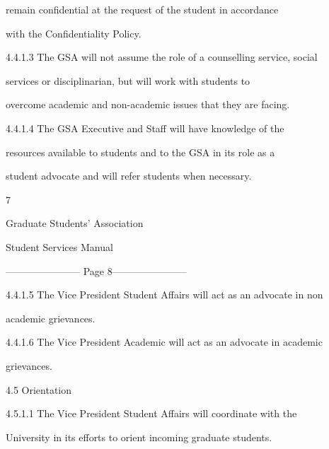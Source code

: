               remain  confidential  at  the  request  of  the  student  in  accordance  

              with the Confidentiality Policy.   



4.4.1.3       The GSA will not assume the role of a counselling service, social  

              services     or   disciplinarian,   but       will    work     with    students     to  

              overcome academic and non-academic issues that they are facing.   



4.4.1.4       The   GSA   Executive   and   Staff   will   have   knowledge   of  the  

              resources  available  to  students  and  to  the  GSA  in  its  role  as  a  

              student advocate and will refer students when necessary.   



                                                 7  



                                   Graduate Students’ Association  



                                        Student Services Manual  



  


----------------------- Page 8-----------------------

   4.4.1.5     The Vice President Student Affairs will act as an advocate in non  

               academic grievances.   



   4.4.1.6     The Vice President Academic will act as an advocate in academic  

               grievances.   



  



                                        4.5      Orientation   



   4.5.1.1     The  Vice  President  Student  Affairs  will  coordinate  with  the  

               University in its efforts to orient incoming graduate students.   




